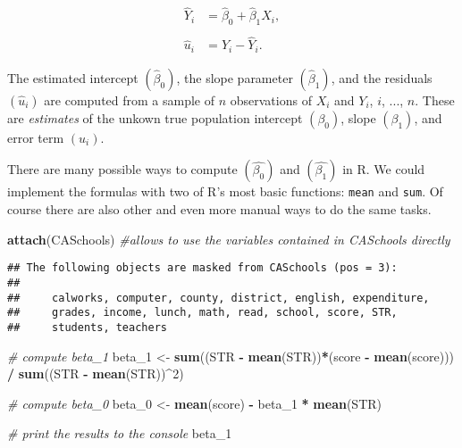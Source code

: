 \documentclass[]{book}
\newenvironment{Shaded}{\begin{snugshade}}{\end{snugshade}}
\newcommand{\KeywordTok}[1]{\textcolor[rgb]{0.13,0.29,0.53}{\textbf{#1}}}
\newcommand{\DecValTok}[1]{\textcolor[rgb]{0.00,0.00,0.81}{#1}}
\newcommand{\StringTok}[1]{\textcolor[rgb]{0.31,0.60,0.02}{#1}}
\newcommand{\CommentTok}[1]{\textcolor[rgb]{0.56,0.35,0.01}{\textit{#1}}}
\newcommand{\OperatorTok}[1]{\textcolor[rgb]{0.81,0.36,0.00}{\textbf{#1}}}
\newcommand{\NormalTok}[1]{#1}
\theoremstyle{definition}
\theoremstyle{definition}
\theoremstyle{definition}
\theoremstyle{remark}
\begin{document}
\begin{align}
  \hat{Y}_i & =  \hat{\beta}_0 + \hat{\beta}_1 X_i,\\
  \\
  \hat{u}_i & =  Y_i - \hat{Y}_i. 
\end{align}

The estimated intercept \((\hat{\beta}_0)\), the slope parameter
\((\hat{\beta}_1)\), and the residuals \(\left(\hat{u}_i\right)\) are
computed from a sample of \(n\) observations of \(X_i\) and \(Y_i\),
\(i\), \(...\), \(n\). These are \emph{estimates} of the unkown true
population intercept \(\left(\beta_0 \right)\), slope
\(\left(\beta_1\right)\), and error term \((u_i)\).

There are many possible ways to compute \(\left(\hat{\beta_0}\right)\)
and \(\left(\hat{\beta_1}\right)\) in R. We could implement the formulas
with two of R's most basic functions: \texttt{mean} and \texttt{sum}. Of
course there are also other and even more manual ways to do the same
tasks.

\begin{Shaded}
\begin{Highlighting}[]
\KeywordTok{attach}\NormalTok{(CASchools) }\CommentTok{#allows to use the variables contained in CASchools directly}
\end{Highlighting}
\end{Shaded}

\begin{verbatim}
## The following objects are masked from CASchools (pos = 3):
## 
##     calworks, computer, county, district, english, expenditure,
##     grades, income, lunch, math, read, school, score, STR,
##     students, teachers
\end{verbatim}

\begin{Shaded}
\begin{Highlighting}[]
\CommentTok{# compute beta_1 }
\NormalTok{beta_}\DecValTok{1}\NormalTok{ <-}\StringTok{ }\KeywordTok{sum}\NormalTok{((STR }\OperatorTok{-}\StringTok{ }\KeywordTok{mean}\NormalTok{(STR))}\OperatorTok{*}\NormalTok{(score }\OperatorTok{-}\StringTok{ }\KeywordTok{mean}\NormalTok{(score))) }\OperatorTok{/}\StringTok{ }\KeywordTok{sum}\NormalTok{((STR }\OperatorTok{-}\StringTok{ }\KeywordTok{mean}\NormalTok{(STR))}\OperatorTok{^}\DecValTok{2}\NormalTok{)}

\CommentTok{# compute beta_0}
\NormalTok{beta_}\DecValTok{0}\NormalTok{ <-}\StringTok{ }\KeywordTok{mean}\NormalTok{(score) }\OperatorTok{-}\StringTok{ }\NormalTok{beta_}\DecValTok{1} \OperatorTok{*}\StringTok{ }\KeywordTok{mean}\NormalTok{(STR)}

\CommentTok{# print the results to the console}
\NormalTok{beta_}\DecValTok{1}
\end{Highlighting}
\end{Shaded}
\end{document}
